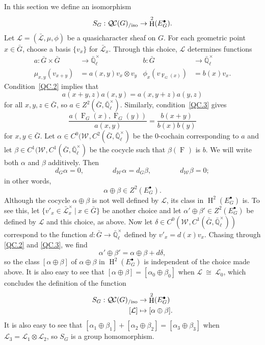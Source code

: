 \documentclass[CM,Submssn,SecEq]{degruyter-crelle} %
\theoremstyle{plain}
\theoremstyle{definition}
\theoremstyle{remark}
\newcommand{\EE}{\mathbb{\bar Q}_\ell}
\newcommand{\EEx}{\EE^\times}
\newcommand{\Weil}[1]{\mathcal{W}_{#1}}
\newcommand{\Frob}[1]{\operatorname{F}_{#1}}
\DeclareMathOperator{\Hh}{H}
\newcommand{\tq}{{\ \vert\ }}
\newcommand{\iso}{{\ \cong\ }}
\newcommand{\qcs}[1]{{\mathcal{#1}}}
\newcommand{\gqcs}[1]{{\mathcal{\bar #1}}}
\newcommand{\QC}{{\mathcal{Q\hskip-0.8pt C}}}
\newcommand{\QCiso}[1]{\QC(#1)_{/\text{iso}}}
\begin{document}
In this section we define an isomorphism
\[
S_G : \QCiso{G} \to \Hh^2(E^\bullet_G).
\]
Let $\qcs{L} = (\gqcs{L},\mu,\phi)$ be a quasicharacter sheaf on $G$.
For each geometric point $x\in {\bar G}$, choose a basis $\{ v_x \}$ for $\gqcs{L}_x$.
Through this choice, $\qcs{L}$ determines functions
\begin{align*}
a : {\bar G}\times {\bar G} &\to \EEx & b : {\bar G} &\to \EEx \\
\mu_{x,y}(v_{x+y}) &= a(x,y) v_x \otimes v_y & \phi_x(v_{\Frob{G}(x)}) &= b(x) v_x.
\end{align*}
Condition~\ref{QC.2} implies that
\begin{equation}\label{2-cocyle}
a(x+y,z) a(x,y) = a(x,y+z) a(y,z)
\end{equation}
for all $x,y,z\in {\bar G}$, so $a \in Z^2({\bar G},\EEx)$.  Similarly, condition~\ref{QC.3} gives
\begin{equation}\label{nohom}
\frac{a(\Frob{G}(x),\Frob{G}(y))}{a(x,y)} =  \frac{b(x+y)}{b(x) b(y)}
\end{equation}
for $x, y \in {\bar G}$.
Let $\alpha \in C^0(\Weil{},C^2({\bar G},\EEx)$ be the $0$-cochain corresponding to $a$ and let $\beta\in C^1(\Weil{},C^1({\bar G},\EEx)$ be the cocycle such that $\beta(\Frob{})$ is $b$.  We will write both $\alpha$ and $\beta$ additively.
Then
\[
d_G\alpha =0, \qquad\qquad
d_{\Weil{}} \alpha = d_{G} \beta,\qquad\qquad
d_{\Weil{}} \beta =0;
\]
in other words,
\[\alpha\oplus \beta \in Z^2(E^\bullet_G).\]
Although the cocycle $\alpha\oplus \beta$ is not well defined by $\qcs{L}$, its class in $\Hh^2(E^\bullet_G)$ is.
To see this, let $\{ v'_x \in \gqcs{L}_x^\times \tq x \in {\bar G}\}$ be another choice and let $\alpha'\oplus \beta' \in Z^2(E^\bullet_G)$ be defined by $\qcs{L}$ and this choice, as above.
Now let $\delta \in C^0(\Weil{},C^1({\bar G},\EEx))$ correspond to the function $d : {\bar G}\to \EEx$ defined by $v'_x = d(x) v_x$.
Chasing through \ref{QC.2} and \ref{QC.3}, we find
\[
\alpha'\oplus\beta' = \alpha\oplus\beta + d\delta,
\]
so the class $[\alpha\oplus\beta]$ of $\alpha\oplus\beta$ in $\Hh^2(E^\bullet_G)$ is independent of the choice made above. It is also easy to see that $[\alpha\oplus\beta] = [\alpha_0\oplus\beta_0]$ when $\qcs{L} \iso \qcs{L}_0$,
which concludes the definition of the function
\begin{align*}
S_G : \QCiso{G} &\to \Hh^2(E^\bullet_G)\\
[\qcs{L}] &\mapsto [\alpha\oplus \beta].
\end{align*}
It is also easy to see that $[\alpha_1\oplus\beta_1] + [\alpha_2\oplus\beta_2] = [\alpha_3\oplus\beta_3]$ when $\qcs{L}_3 = \qcs{L}_1\otimes \qcs{L}_2$, so $S_G$ is a group homomorphism.
\end{document}
